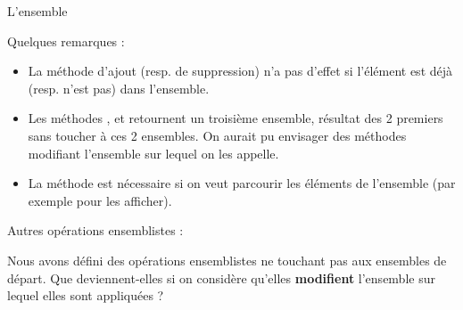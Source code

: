 \begin{Exercice}{L'ensemble}
	\bigskip

	Quelques remarques :
	\begin{itemize}
		\item 
			La méthode d'ajout (resp. de suppression) n'a
			pas d'effet si l'élément est déjà
			(resp. n'est pas) dans l'ensemble.
		\item 
			Les méthodes , 
			 et 
			 retournent un troisième ensemble, 
			résultat des 2 premiers sans toucher
			à ces 2 ensembles. On aurait pu envisager des méthodes modifiant
			l'ensemble sur lequel on les appelle.
		\item 
			La méthode 
			est nécessaire si on veut parcourir les éléments de
			l'ensemble (par exemple pour les afficher).
	\end{itemize}
	
	Autres opérations ensemblistes :
	
	Nous avons défini des opérations ensemblistes ne touchant pas aux
	ensembles de départ. Que deviennent-elles si on considère
	qu'elles \textbf{modifient}
	l'ensemble sur lequel elles sont appliquées ?
\end{Exercice}

